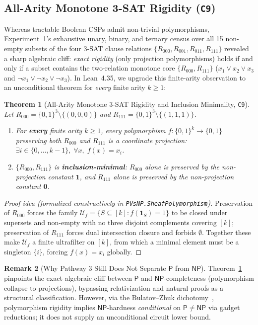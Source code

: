 \documentclass[11pt,reqno]{amsart}
\newcommand{\code}[1]{\texttt{\nolinkurl{#1}}}
\newtheorem{theorem}{Theorem}[section]
\theoremstyle{definition}
\newtheorem{remark}[theorem]{Remark}
\newcommand{\PP}{\mathsf{P}}
\newcommand{\NP}{\mathsf{NP}}
\begin{document}
\subsection{All-Arity Monotone 3-SAT Rigidity (\texttt{C9})}
Whereas tractable Boolean CSPs admit non-trivial polymorphisms, Experiment~1's
exhaustive unary, binary, and ternary census over all 15 non-empty subsets of the
four 3-SAT clause relations $\{R_{000}, R_{001}, R_{011}, R_{111}\}$ revealed a
sharp algebraic cliff: \emph{exact rigidity} (only projection polymorphisms) holds if
and only if a subset contains the two-relation monotone core $\{R_{000}, R_{111}\}$
($x_1 \lor x_2 \lor x_3$ and $\neg x_1 \lor \neg x_2 \lor \neg x_3$). In Lean~4.35, we
upgrade this finite-arity observation to an unconditional theorem for \emph{every} finite
arity $k \ge 1$:

\begin{theorem}[All-Arity Monotone 3-SAT Rigidity and Inclusion Minimality, \texttt{C9}]
\label{thm:monotone-rigid}
Let $R_{000} = \{0,1\}^3 \setminus \{(0,0,0)\}$ and $R_{111} = \{0,1\}^3 \setminus \{(1,1,1)\}$.
\begin{enumerate}[leftmargin=1.6em]
\item For \textbf{every} finite arity $k \ge 1$, every polymorphism
      $f : \{0,1\}^k \to \{0,1\}$ preserving both $R_{000}$ and $R_{111}$ is a coordinate
      projection: $\exists i \in \{0,\dots,k-1\},\; \forall x,\; f(x) = x_i$.
\item $\{R_{000}, R_{111}\}$ is \textbf{inclusion-minimal}: $R_{000}$ alone is preserved
      by the non-projection constant $\mathbf{1}$, and $R_{111}$ alone is preserved by
      the non-projection constant $\mathbf{0}$.
\end{enumerate}
\end{theorem}

\begin{proof}[Proof idea (formalized constructively in \code{PVsNP.SheafPolymorphism})]
Preservation of $R_{000}$ forces the family $\mathcal{U}_f = \{S \subseteq [k] : f(\mathbf{1}_S) = 1\}$
to be closed under supersets and non-empty with no three disjoint complements covering
$[k]$; preservation of $R_{111}$ forces dual intersection closure and forbids $\emptyset$.
Together these make $\mathcal{U}_f$ a finite ultrafilter on $[k]$, from which a minimal
element must be a singleton $\{i\}$, forcing $f(x) = x_i$ globally.
\end{proof}

\begin{remark}[Why Pathway 3 Still Does Not Separate $\PP$ from $\NP$]
Theorem~\ref{thm:monotone-rigid} pinpoints the exact algebraic cliff between $\PP$ and
$\NP$-completeness (polymorphism collapse to projections), bypassing relativization and
natural proofs as a structural classification. However, via the Bulatov--Zhuk
dichotomy~\cite{Bulatov2017,Zhuk2020}, polymorphism rigidity implies $\NP$-hardness
\emph{conditional} on $\PP \neq \NP$ via gadget reductions; it does not supply an
unconditional circuit lower bound.
\end{remark}
\end{document}
